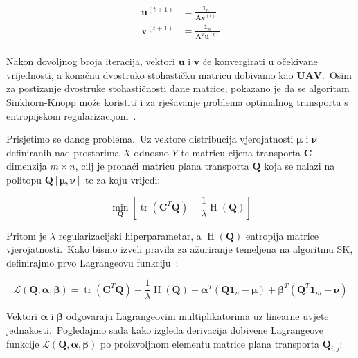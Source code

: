 \documentclass[diplomskirad]{fer}
\begin{document}
\begin{equation}
  \begin{aligned}
    \bm{u}^{(t + 1)} &= \frac{\bm{1}_n}{\bm{A} \bm{v}^{(t)}} \\
    \bm{v}^{(t + 1)} &= \frac{\bm{1}_n}{\bm{A}^T \bm{u}^{(t)}} \\
  \end{aligned}
  \label{eq:sk_basic_form}
\end{equation}

Nakon dovoljnog broja iteracija, vektori $\bm{u}$ i $\bm{v}$ će konvergirati u očekivane vrijednosti, a konačnu dvostruko stohastičku matricu dobivamo kao $\bm{U} \bm{A} \bm{V}$.\ 
Osim za postizanje dvostruke stohastičnosti dane matrice, pokazano je da se algoritam Sinkhorn-Knopp može koristiti i za rješavanje problema optimalnog transporta s entropijskom regularizacijom~\cite{cuturi2013sinkhorn}.\ 

Prisjetimo se danog problema.\ Uz vektore distribucija vjerojatnosti $\bm{\mu}$ i $\bm{\nu}$ definiranih nad prostorima $X$ odnosno $Y$ te matricu cijena transporta $\bm{C}$ dimenzija $m \times n$, cilj je pronaći matricu plana transporta $\bm{Q}$ koja se nalazi na politopu $\bm{Q}\left[ \bm{\mu}, \bm{\nu} \right]$ te za koju vrijedi:

\begin{equation}
  \min_{\bm{Q}} \left[ \operatorname{tr}(\bm{C}^T \bm{Q}) - \frac{1}{\lambda} \operatorname{H}(\bm{Q}) \right]
  \label{eq:ot_with_entropy_repeat}
\end{equation}

Pritom je $\lambda$ regularizacijski hiperparametar, a $\operatorname{H}(\bm{Q})$ entropija matrice vjerojatnosti.\ Kako bismo izveli pravila za ažuriranje temeljena na algoritmu SK, definirajmo prvo Lagrangeovu funkciju~\cite{slater2013lagrange}:

\begin{equation}
  \mathcal{L}(\bm{Q}, \bm{\alpha}, \bm{\beta}) = \operatorname{tr}(\bm{C}^T \bm{Q}) - \frac{1}{\lambda} \operatorname{H}(\bm{Q}) + \bm{\alpha}^T (\bm{Q} \bm{1}_n - \bm{\mu}) + \bm{\beta}^T (\bm{Q}^T \bm{1}_m - \bm{\nu})
  \label{eq:sk_lagrange}
\end{equation}

Vektori $\bm{\alpha}$ i $\bm{\beta}$ odgovaraju Lagrangeovim multiplikatorima uz linearne uvjete jednakosti.\ Pogledajmo sada kako izgleda derivacija dobivene Lagrangeove funkcije $\mathcal{L}(\bm{Q}, \bm{\alpha}, \bm{\beta})$ po proizvoljnom elementu matrice plana transporta $\bm{Q}_{i,j}$:
\end{document}
